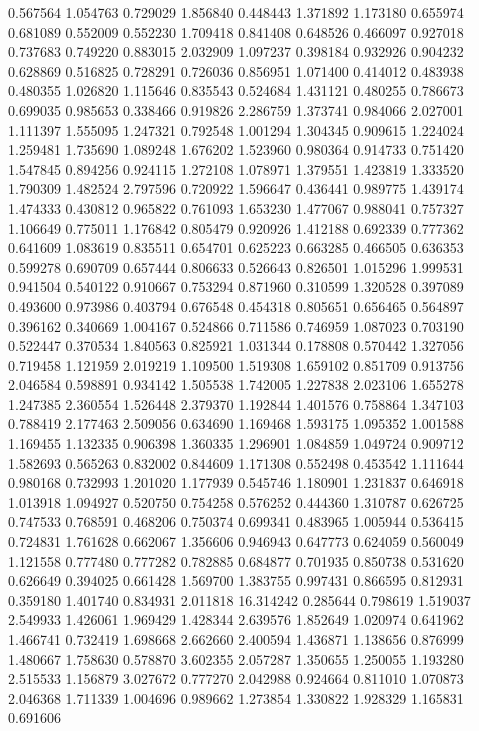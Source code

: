 0.567564
1.054763
0.729029
1.856840
0.448443
1.371892
1.173180
0.655974
0.681089
0.552009
0.552230
1.709418
0.841408
0.648526
0.466097
0.927018
0.737683
0.749220
0.883015
2.032909
1.097237
0.398184
0.932926
0.904232
0.628869
0.516825
0.728291
0.726036
0.856951
1.071400
0.414012
0.483938
0.480355
1.026820
1.115646
0.835543
0.524684
1.431121
0.480255
0.786673
0.699035
0.985653
0.338466
0.919826
2.286759
1.373741
0.984066
2.027001
1.111397
1.555095
1.247321
0.792548
1.001294
1.304345
0.909615
1.224024
1.259481
1.735690
1.089248
1.676202
1.523960
0.980364
0.914733
0.751420
1.547845
0.894256
0.924115
1.272108
1.078971
1.379551
1.423819
1.333520
1.790309
1.482524
2.797596
0.720922
1.596647
0.436441
0.989775
1.439174
1.474333
0.430812
0.965822
0.761093
1.653230
1.477067
0.988041
0.757327
1.106649
0.775011
1.176842
0.805479
0.920926
1.412188
0.692339
0.777362
0.641609
1.083619
0.835511
0.654701
0.625223
0.663285
0.466505
0.636353
0.599278
0.690709
0.657444
0.806633
0.526643
0.826501
1.015296
1.999531
0.941504
0.540122
0.910667
0.753294
0.871960
0.310599
1.320528
0.397089
0.493600
0.973986
0.403794
0.676548
0.454318
0.805651
0.656465
0.564897
0.396162
0.340669
1.004167
0.524866
0.711586
0.746959
1.087023
0.703190
0.522447
0.370534
1.840563
0.825921
1.031344
0.178808
0.570442
1.327056
0.719458
1.121959
2.019219
1.109500
1.519308
1.659102
0.851709
0.913756
2.046584
0.598891
0.934142
1.505538
1.742005
1.227838
2.023106
1.655278
1.247385
2.360554
1.526448
2.379370
1.192844
1.401576
0.758864
1.347103
0.788419
2.177463
2.509056
0.634690
1.169468
1.593175
1.095352
1.001588
1.169455
1.132335
0.906398
1.360335
1.296901
1.084859
1.049724
0.909712
1.582693
0.565263
0.832002
0.844609
1.171308
0.552498
0.453542
1.111644
0.980168
0.732993
1.201020
1.177939
0.545746
1.180901
1.231837
0.646918
1.013918
1.094927
0.520750
0.754258
0.576252
0.444360
1.310787
0.626725
0.747533
0.768591
0.468206
0.750374
0.699341
0.483965
1.005944
0.536415
0.724831
1.761628
0.662067
1.356606
0.946943
0.647773
0.624059
0.560049
1.121558
0.777480
0.777282
0.782885
0.684877
0.701935
0.850738
0.531620
0.626649
0.394025
0.661428
1.569700
1.383755
0.997431
0.866595
0.812931
0.359180
1.401740
0.834931
2.011818
16.314242
0.285644
0.798619
1.519037
2.549933
1.426061
1.969429
1.428344
2.639576
1.852649
1.020974
0.641962
1.466741
0.732419
1.698668
2.662660
2.400594
1.436871
1.138656
0.876999
1.480667
1.758630
0.578870
3.602355
2.057287
1.350655
1.250055
1.193280
2.515533
1.156879
3.027672
0.777270
2.042988
0.924664
0.811010
1.070873
2.046368
1.711339
1.004696
0.989662
1.273854
1.330822
1.928329
1.165831
0.691606
